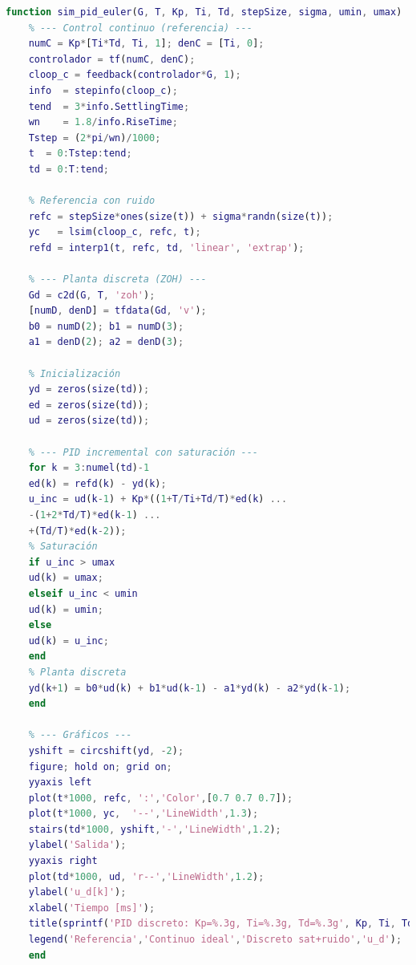 \begin{lstlisting}[language=Matlab,style=matlabstyle, caption={PID discreto con saturación y ruido}, label={lst:pid_sat_noise}]
	function sim_pid_euler(G, T, Kp, Ti, Td, stepSize, sigma, umin, umax)
	% --- Control continuo (referencia) ---
	numC = Kp*[Ti*Td, Ti, 1]; denC = [Ti, 0];
	controlador = tf(numC, denC);
	cloop_c = feedback(controlador*G, 1);
	info  = stepinfo(cloop_c);
	tend  = 3*info.SettlingTime;
	wn    = 1.8/info.RiseTime;
	Tstep = (2*pi/wn)/1000;
	t  = 0:Tstep:tend;
	td = 0:T:tend;
	
	% Referencia con ruido
	refc = stepSize*ones(size(t)) + sigma*randn(size(t));
	yc   = lsim(cloop_c, refc, t);
	refd = interp1(t, refc, td, 'linear', 'extrap');
	
	% --- Planta discreta (ZOH) ---
	Gd = c2d(G, T, 'zoh');
	[numD, denD] = tfdata(Gd, 'v');
	b0 = numD(2); b1 = numD(3);
	a1 = denD(2); a2 = denD(3);
	
	% Inicialización
	yd = zeros(size(td));
	ed = zeros(size(td));
	ud = zeros(size(td));
	
	% --- PID incremental con saturación ---
	for k = 3:numel(td)-1
	ed(k) = refd(k) - yd(k);
	u_inc = ud(k-1) + Kp*((1+T/Ti+Td/T)*ed(k) ...
	-(1+2*Td/T)*ed(k-1) ...
	+(Td/T)*ed(k-2));
	% Saturación
	if u_inc > umax
	ud(k) = umax;
	elseif u_inc < umin
	ud(k) = umin;
	else
	ud(k) = u_inc;
	end
	% Planta discreta
	yd(k+1) = b0*ud(k) + b1*ud(k-1) - a1*yd(k) - a2*yd(k-1);
	end
	
	% --- Gráficos ---
	yshift = circshift(yd, -2);
	figure; hold on; grid on;
	yyaxis left
	plot(t*1000, refc, ':','Color',[0.7 0.7 0.7]);
	plot(t*1000, yc,  '--','LineWidth',1.3);
	stairs(td*1000, yshift,'-','LineWidth',1.2);
	ylabel('Salida');
	yyaxis right
	plot(td*1000, ud, 'r--','LineWidth',1.2);
	ylabel('u_d[k]');
	xlabel('Tiempo [ms]');
	title(sprintf('PID discreto: Kp=%.3g, Ti=%.3g, Td=%.3g', Kp, Ti, Td));
	legend('Referencia','Continuo ideal','Discreto sat+ruido','u_d');
	end
\end{lstlisting}
